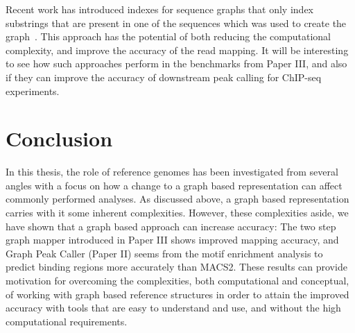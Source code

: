Recent work has introduced indexes for sequence graphs that only index substrings that are present in one of the sequences which was used to create the graph~\cite{haplotypeaware}.
This approach has the potential of both reducing the computational complexity, and improve the accuracy of the read mapping.
It will be interesting to see how such approaches perform in the benchmarks from Paper III, and also if they can improve the accuracy of downstream peak calling for ChIP-seq experiments.

\section{Conclusion}
In this thesis, the role of reference genomes has been investigated from several angles with a focus on how a change to a graph based representation can affect commonly performed analyses.
As discussed above, a graph based representation carries with it some inherent complexities.
However, these complexities aside, we have shown that a graph based approach can increase accuracy: The two step graph mapper introduced in Paper III shows improved mapping accuracy, and Graph Peak Caller (Paper II) seems from the motif enrichment analysis to  predict binding regions more accurately than MACS2.
These results can provide motivation for overcoming the complexities, both computational and conceptual, of working with graph based reference structures in order to attain the improved accuracy with tools that are easy to understand and use, and without the high computational requirements.

